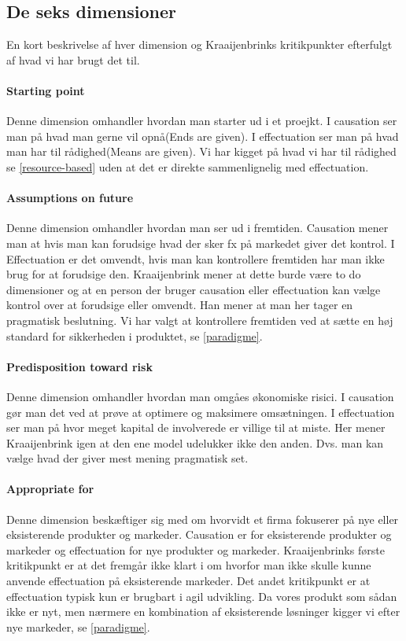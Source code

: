 \subsection{De seks dimensioner}
En kort beskrivelse af hver dimension og Kraaijenbrinks kritikpunkter efterfulgt af hvad vi har brugt det til.

\paragraph{Starting point}
Denne dimension omhandler hvordan man starter ud i et proejkt.
I causation ser man på hvad man gerne vil opnå(Ends are given).
I effectuation ser man på hvad man har til rådighed(Means are given).
Vi har kigget på hvad vi har til rådighed se \cref{resource-based} uden at det er direkte sammenlignelig med effectuation.

\paragraph{Assumptions on future}
Denne dimension omhandler hvordan man ser ud i fremtiden.
Causation mener man at hvis man kan forudsige hvad der sker fx på markedet giver det kontrol.
I Effectuation er det omvendt, hvis man kan kontrollere fremtiden har man ikke brug for at forudsige den.
Kraaijenbrink mener at dette burde være to do dimensioner og at en person der bruger causation eller effectuation kan vælge kontrol over at forudsige eller omvendt.
Han mener at man her tager en pragmatisk beslutning.
Vi har valgt at kontrollere fremtiden ved at sætte en høj standard for sikkerheden i produktet, se \cref{paradigme}.

\paragraph{Predisposition toward risk}
Denne dimension omhandler hvordan man omgåes økonomiske risici.
I causation gør man det ved at prøve at optimere og maksimere omsætningen.
I effectuation ser man på hvor meget kapital de involverede er villige til at miste.
Her mener Kraaijenbrink igen at den ene model udelukker ikke den anden.
Dvs. man kan vælge hvad der giver mest mening pragmatisk set.

\paragraph{Appropriate for}
Denne dimension beskæftiger sig med om hvorvidt et firma fokuserer på nye eller eksisterende produkter og markeder.
Causation er for eksisterende produkter og markeder og effectuation for nye produkter og markeder.
Kraaijenbrinks første kritikpunkt er at det fremgår ikke klart i \citet{sarasvathy2001effectuation} om hvorfor man ikke skulle kunne anvende effectuation på eksisterende markeder.
Det andet kritikpunkt er at effectuation typisk kun er brugbart i agil udvikling.
Da vores produkt som sådan ikke er nyt, men nærmere en kombination af eksisterende løsninger kigger vi efter nye markeder, se \cref{paradigme}.

